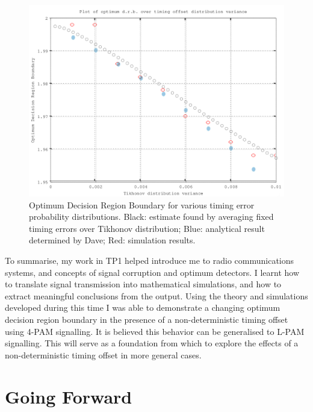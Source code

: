 \begin{figure}[htbp]
\centering
\includegraphics[width=\linewidth]{../../../plots/opt_dec_reg.png}
\caption{Optimum Decision Region Boundary for various timing error
probability distributions. Black: estimate found by averaging fixed timing errors over Tikhonov distribution; Blue: analytical result determined by Dave; Red: simulation results.}
\end{figure}

To summarise, my work in TP1 helped introduce me to radio communications
systems, and concepts of signal corruption and optimum detectors. I
learnt how to translate signal transmission into mathematical
simulations, and how to extract meaningful conclusions from the output.
Using the theory and simulations developed during this time I was able
to demonstrate a changing optimum decision region boundary in the
presence of a non-deterministic timing offset using 4-PAM signalling. It
is believed this behavior can be generalised to L-PAM signalling.  This
will serve as a foundation from which to explore the effects of a
non-deterministic timing offset in more general cases.


\part{Going Forward}

